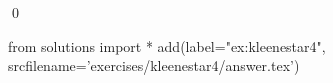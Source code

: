 
\begin{ex} 
  \label{ex:kleenestar4}
  
  \qed
\end{ex} 
\begin{python0}
from solutions import *
add(label="ex:kleenestar4",
    srcfilename='exercises/kleenestar4/answer.tex') 
\end{python0}
